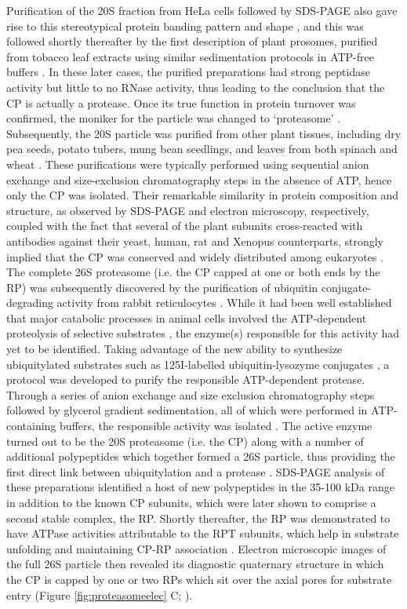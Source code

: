	  Purification of the 20S fraction from HeLa cells followed by SDS-PAGE also gave rise to this stereotypical protein banding pattern and shape \citep{schmid84}, and this was followed shortly thereafter by the first description of plant prosomes, purified from tobacco leaf extracts using similar sedimentation protocols in ATP-free buffers \citep{kremp86}.  In these later cases, the purified preparations had strong peptidase activity but little to no RNase activity, thus leading to the conclusion that the CP is actually a protease.  Once its true function in protein turnover was confirmed, the moniker for the particle was changed to `proteasome' \citep{arrigo88}.  
	Subsequently, the 20S particle was purified from other plant tissues, including dry pea seeds, potato tubers, mung bean seedlings, and leaves from both spinach and wheat \citep{murray97, ozaki92, schliephacke91, skoda92}.  These purifications were typically performed using sequential anion exchange and size-exclusion chromatography steps in the absence of ATP, hence only the CP was isolated.  Their remarkable similarity in protein composition and structure, as observed by SDS-PAGE and electron microscopy, respectively, coupled with the fact that several of the plant subunits cross-reacted with antibodies against their yeast, human, rat and Xenopus counterparts, strongly implied that the CP was conserved and widely distributed among eukaryotes \citep{schliephacke91}.
	The complete 26S proteasome (i.e. the CP capped at one or both ends by the RP) was subsequently discovered by the purification of ubiquitin conjugate-degrading activity from rabbit reticulocytes \citep{hough86}.  While it had been well established that major catabolic processes in animal cells involved the ATP-dependent proteolysis of selective substrates \citep{etlinger77}, the enzyme(s) responsible for this activity had yet to be identified.  Taking advantage of the new ability to synthesize ubiquitylated substrates such as 125I-labelled ubiquitin-lysozyme conjugates \citep{hough86-1xVPf}, a protocol was developed to purify the responsible ATP-dependent protease.  Through a series of anion exchange and size exclusion chromatography steps followed by glycerol gradient sedimentation, all of which were performed in ATP-containing buffers, the responsible activity was isolated \citep{hough86, hough87}. The active enzyme turned out to be the 20S proteasome (i.e. the CP) along with a number of additional polypeptides which together formed a 26S particle, thus providing the first direct link between ubiquitylation and a protease \citep{ganoth88, hough87, waxman87}.  SDS-PAGE analysis of these preparations identified a host of new polypeptides in the 35-100 kDa range in addition to the known CP subunits, which were later shown to comprise a second stable complex, the RP.  Shortly thereafter, the RP was demonstrated to have ATPase activities attributable to the RPT subunits, which help in substrate unfolding and maintaining CP-RP association \citep{armon90}.  Electron microscopic images of the full 26S particle then revealed its diagnostic quaternary structure in which the CP is capped by one or two RPs which sit over the axial pores for substrate entry (Figure \ref{fig:proteasomeelec} C; \citep{peters91, yoshimura93}).
